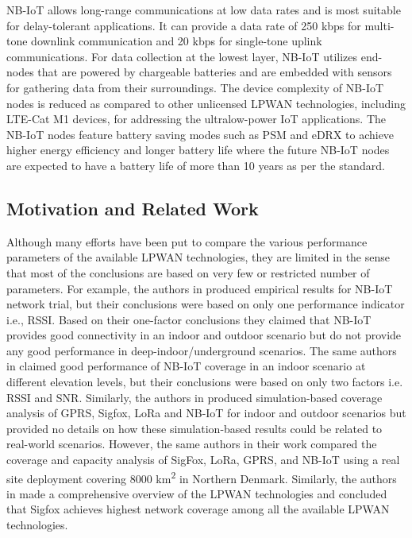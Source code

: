 \documentclass[conference,a4paper,xcolor=table]{IEEEtran}
\begin{document}
NB-IoT allows long-range communications at low data rates and is most suitable for delay-tolerant applications. It can provide a data rate of 250 kbps for multi-tone downlink communication and 20 kbps for single-tone uplink communications. For data collection at the lowest layer, NB-IoT utilizes end-nodes that are powered by
chargeable batteries and are embedded with sensors for gathering data from their surroundings. The device complexity of NB-IoT nodes is reduced as compared to other unlicensed LPWAN technologies, including LTE-Cat M1 devices, for addressing the ultralow-power IoT applications. The NB-IoT nodes feature battery saving modes such as PSM and eDRX to achieve higher energy efficiency and longer battery life where the future NB-IoT nodes are expected to have a battery life of more than 10 years as per the standard.

\subsection{Motivation and Related Work}
Although many efforts have been put to compare the various performance parameters of the available LPWAN technologies, they are limited in the sense that most of the conclusions are based on very few or restricted number of parameters. For example, the authors in \cite{malik2019nb} produced empirical results for NB-IoT network trial, but their conclusions were based on only one performance indicator i.e., RSSI. Based on their one-factor conclusions they claimed that NB-IoT provides good connectivity in an indoor and outdoor scenario but do not provide any good performance in deep-indoor/underground scenarios. The same authors in \cite{khan2019dorm} claimed good performance of NB-IoT coverage in an indoor scenario at different elevation levels, but their conclusions were based on only two factors i.e. RSSI and SNR. Similarly, the authors in \cite{lauridsen2017coverage} produced simulation-based coverage analysis of GPRS, Sigfox, LoRa and NB-IoT for indoor and outdoor scenarios but provided no details on how these simulation-based results could be related to real-world scenarios. However, the same authors in their work \cite{vejlgaard2017coverage} compared the coverage and capacity analysis of SigFox, LoRa, GPRS, and NB-IoT  using a real site deployment covering 8000 km\textsuperscript{2} in Northern Denmark. Similarly, the authors in \cite{mekki2018overview} made a comprehensive overview of the LPWAN technologies and concluded that Sigfox achieves highest network coverage among all the available LPWAN technologies.\par
\end{document}
